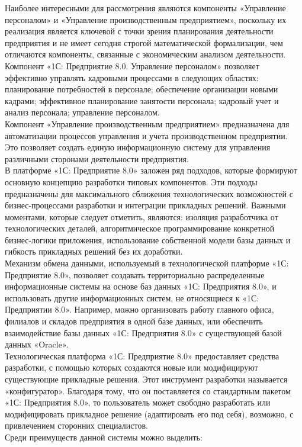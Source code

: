 \indent Наиболее интересными для рассмотрения являются компоненты «Управление персоналом» и «Управление производственным предприятием», поскольку их реализация является ключевой с точки зрения планирования деятельности предприятия и не имеет сегодня строгой математической формализации, чем отличаются компоненты, связанные с экономическим анализом деятельности.\\
\indent Компонент «1С: Предприятие 8.0. Управление персоналом» позволяет эффективно управлять кадровыми процессами в следующих областях: планирование потребностей в персонале; обеспечение организации новыми кадрами; эффективное планирование занятости персонала; кадровый учет и анализ персонала; управление персоналом.\\
\indent Компонент «Управление производственным предприятием» предназначена для автоматизации процессов управления и учета производственном предприятии.
Это позволяет создать единую информационную систему для управления различными сторонами деятельности предприятия.\\
\indent В платформе «1С: Предприятие 8.0» заложен ряд подходов, которые формируют основную концепцию разработки типовых компонентов. 
Эти подходы предназначены для максимального сближения технологических возможностей с бизнес-процессами разработки и интеграции прикладных решений.
Важными моментами, которые следует отметить, являются: изоляция разработчика от технологических деталей, алгоритмическое программирование конкретной бизнес-логики приложения, использование собственной модели базы данных и гибкость прикладных решений без их доработки.\\
\indent Механизм обмена данными, используемый в технологической платформе «1С: Предприятие 8.0», позволяет создавать территориально распределенные информационные системы на основе баз данных «1С: Предприятия 8.0», и использовать другие информационных систем, не относящиеся к «1С: Предприятии 8.0».
Например, можно организовать работу главного офиса, филиалов и складов предприятия в одной базе данных, или обеспечить взаимодействие базы данных «1С: Предприятия 8.0» с существующей базой данных «Oracle».\\
\indent Технологическая платформа «1С: Предприятие 8.0» предоставляет средства разработки, с помощью которых создаются новые или модифицируют существующие прикладные решения.
Этот инструмент разработки называется «конфигуратор».
Благодаря тому, что он поставляется со стандартным пакетом «1С: Предприятия 8.0», то пользователь может свободно разработать или модифицировать прикладное решение (адаптировать его под себя), возможно, с привлечением сторонних специалистов.\\
\indent Среди преимуществ данной системы можно выделить:

